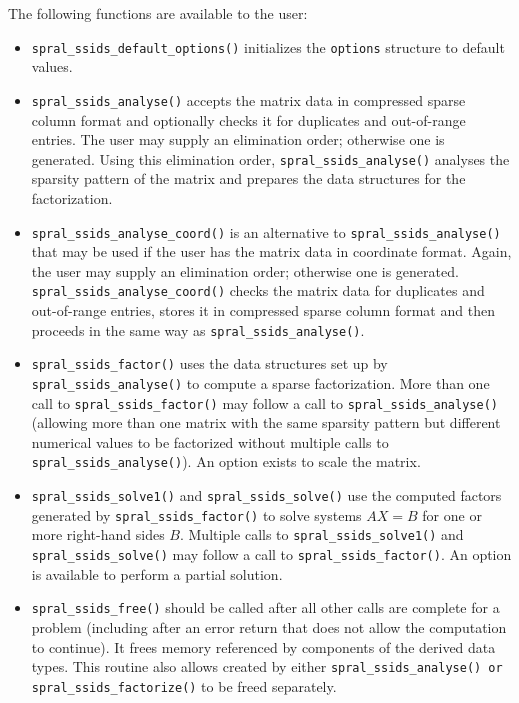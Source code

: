 \noindent
The following functions are available to the user:
\begin{itemize}
\item {\tt spral\_ssids\_default\_options()} initializes the \texttt{options}
structure to default values.

\item {\tt spral\_ssids\_analyse()} accepts the matrix data in compressed
sparse column format and optionally checks it for duplicates and  out-of-range entries.
The user may supply an elimination order; otherwise
one is generated. Using this elimination order,
{\tt spral\_ssids\_analyse()} analyses the sparsity pattern of
the matrix and prepares the data structures for the factorization.

 \item {\tt spral\_ssids\_analyse\_coord()} is an alternative to
{\tt spral\_ssids\_analyse()} that may be used if the user has
the matrix data in coordinate
format. Again, the user may supply an elimination order; otherwise
one is generated. {\tt spral\_ssids\_analyse\_coord()}
checks the matrix data  for duplicates and  out-of-range entries,
stores
it in compressed sparse column format and then proceeds
in the same way as {\tt spral\_ssids\_analyse()}.

\item {\tt spral\_ssids\_factor()} uses the data structures
set up by {\tt spral\_ssids\_analyse()} to compute a sparse
factorization. More than one call to  {\tt spral\_ssids\_factor()}
may follow a call to {\tt spral\_ssids\_analyse()} (allowing more than
one matrix with the same sparsity pattern but different
numerical values to be factorized without multiple calls to
{\tt spral\_ssids\_analyse()}).
An option exists to scale the matrix.

\item {\tt spral\_ssids\_solve1()} and {\tt spral\_ssids\_solve()} use the
   computed factors generated
by  {\tt spral\_ssids\_factor()}
to solve systems ${AX= B}$
for one or more right-hand sides $B$.
Multiple calls to {\tt spral\_ssids\_solve1()} and {\tt spral\_ssids\_solve()}
may follow a call to
{\tt spral\_ssids\_factor()}.
An option is available to perform a partial solution.

\item {\tt spral\_ssids\_free()} should be called after all other calls
are complete for a problem (including after an error
return that does not allow the computation
to continue). It frees memory referenced by components of
the derived data types. This routine also allows created by either
{\tt spral\_ssids\_analyse() or spral\_ssids\_factorize()} to be freed separately.
\end{itemize}

